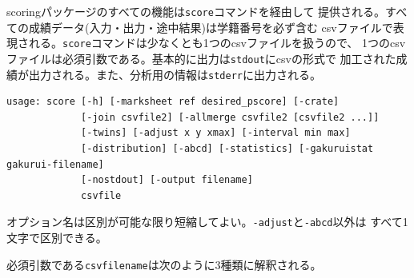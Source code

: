 scoringパッケージのすべての機能は\texttt{score}コマンドを経由して
提供される。すべての成績データ(入力・出力・途中結果)は学籍番号を必ず含む
csvファイルで表現される。\texttt{score}コマンドは少なくとも1つのcsvファイルを扱うので、
1つのcsvファイルは必須引数である。基本的に出力は\texttt{stdout}にcsvの形式で
加工された成績が出力される。また、分析用の情報は\texttt{stderr}に出力される。
\begin{tcolorbox}[enhanced jigsaw,breakable,colframe=\mycolor ,colback=white,colbacktitle=\mycolor ,coltitle=white,fonttitle=\bfseries\sffamily,title=\texttt{\$ score -h}]

\begin{verbatim}
usage: score [-h] [-marksheet ref desired_pscore] [-crate]
             [-join csvfile2] [-allmerge csvfile2 [csvfile2 ...]]
             [-twins] [-adjust x y xmax] [-interval min max]
             [-distribution] [-abcd] [-statistics] [-gakuruistat gakurui-filename]
             [-nostdout] [-output filename]
             csvfile
\end{verbatim}

\end{tcolorbox}
オプション名は区別が可能な限り短縮してよい。\texttt{-adjust}と\texttt{-abcd}以外は
すべて1文字で区別できる。

必須引数である\texttt{csvfilename}は次のように3種類に解釈される。

